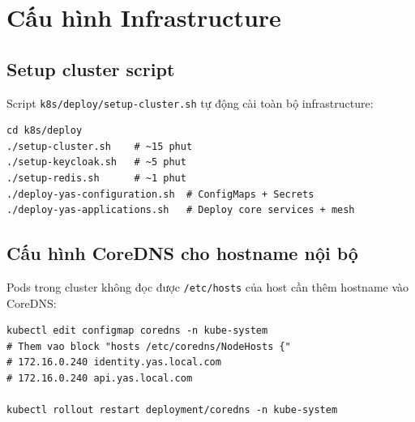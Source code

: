 \section{Cấu hình Infrastructure}

\subsection{Setup cluster script}

Script \texttt{k8s/deploy/setup-cluster.sh} tự động cài toàn bộ infrastructure:

\begin{lstlisting}[style=bashstyle, caption=Chạy setup cluster]
cd k8s/deploy
./setup-cluster.sh    # ~15 phut
./setup-keycloak.sh   # ~5 phut
./setup-redis.sh      # ~1 phut
./deploy-yas-configuration.sh  # ConfigMaps + Secrets
./deploy-yas-applications.sh   # Deploy core services + mesh
\end{lstlisting}

\subsection{Cấu hình CoreDNS cho hostname nội bộ}

Pods trong cluster không đọc được \texttt{/etc/hosts} của host \textrightarrow{} cần thêm hostname
vào CoreDNS:

\begin{lstlisting}[style=bashstyle, caption=Thêm hostname vào CoreDNS]
kubectl edit configmap coredns -n kube-system
# Them vao block "hosts /etc/coredns/NodeHosts {"
# 172.16.0.240 identity.yas.local.com
# 172.16.0.240 api.yas.local.com

kubectl rollout restart deployment/coredns -n kube-system
\end{lstlisting}
